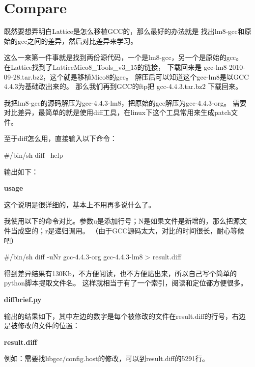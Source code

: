\clearpage
\section{Compare}
既然要想弄明白Lattice是怎么移植GCC的，那么最好的办法就是
找出lm8-gcc和原始的gcc之间的差异，然后对比差异来学习。

这么一来第一件事就是找到两份源代码，一个是lm8-gcc，另一个是原始的gcc。
在Lattice找到了LatticeMico8\_Tools\_v3\_15的链接，
下载回来是 gcc-lm8-2010-09-28.tar.bz2，这个就是移植Mico8的gcc。
解压后可以知道这个gcc-lm8是以GCC 4.4.3为基础改出来的。
那么我们再到GCC的ftp把 gcc-4.4.3.tar.bz2 下载回来。

我把lm8-gcc的源码解压为gcc-4.4.3-lm8，把原始的gcc解压为gcc-4.4.3-org。
需要对比差异，最简单的就是使用diff工具，在linux下这个工具常用来生成patch文件。

至于diff怎么用，直接输入以下命令：
\begin{shcode}
#/bin/sh
diff --help
\end{shcode}

输出如下：

\textbf{usage}


这个说明是很详细的，基本上不用再多说什么了。

我使用以下的命令对比。参数u是添加行号；N是如果文件是新增的，那么把源文件当成空的；r是递归调用。
（由于GCC源码太大，对比的时间很长，耐心等候吧）
\begin{shcode}
#/bin/sh
diff -uNr gcc-4.4.3-org gcc-4.4.3-lm8 > result.diff
\end{shcode}

得到差异结果有130Kb，不方便阅读，也不方便贴出来，所以自己写个简单的python脚本提取文件名。
这样就相当于有了一个索引，阅读和定位都方便很多。

\textbf{diffbrief.py}


输出的结果如下，其中左边的数字是每个被修改的文件在result.diff的行号，右边是被修改的文件的位置：

\textbf{result.diff}


例如：需要找libgcc/config.host的修改，可以到result.diff的5291行。

\clearpage
